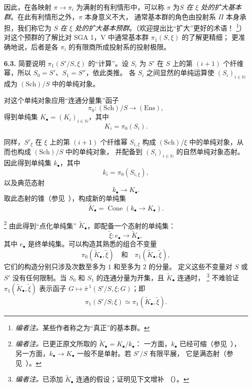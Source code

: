 因此，在各映射 \(\pi\to\pi_i\) 为满射的有利情形中，可以称 \(\pi\)
为\emph{\(S\) 在 \(\xi\) 处的扩大基本群}。在此有利情形之外，\(\pi\) 本身意义不大，
通常基本群的角色由投射系 \(\Pi\) 本身承担，我们称它为
\emph{\(S\) 在 \(\xi\) 处的扩大基本预群}。（欢迎提出比“扩大”更好的术语！
\footnote{\textit{编者注。}某些作者称之为“真正”的基本群。}）
对这个预群的了解比对 SGA 1，V 中通常基本群 \(\pi_1(S,\xi)\) 的了解更精细；
更准确地说，后者是各 \(\pi_i\) 的有限商所成投射系的投射极限。

\par\medskip\noindent
\textbf{6.3.}\enspace
简要说明 \(\pi_1(S'/S,\xi)\) 的“计算”。设 \(S_i\) 为 \(S'\) 在 \(S\)
上的第 \((i+1)\) 个纤维幂，所以 \(S_0=S'\)、\(S_1=S''\)，依此类推。
各 \(S_i\) 之间显然的单纯运算使 \((S_i)_{i\in\mathbb N}\)
成为 \((\mathrm{Sch})/S\) 中的单纯对象。

对这个单纯对象应用“连通分量集”函子
\[
  \pi_0:(\mathrm{Sch})/S\longrightarrow(\mathrm{Ens}),
\]
得到单纯集 \(K_\bullet=(K_i)_{i\in\mathbb N}\)，其中
\[
  K_i=\pi_0(S_i).
\]

同样，\(S'_\xi\) 在 \(\xi\) 上的第 \((i+1)\) 个纤维幂 \(S_{i,\xi}\)
构成 \((\mathrm{Sch})/\xi\) 中的单纯对象，从而也构成 \((\mathrm{Sch})/S\) 中的单纯对象，
并配备到 \((S_i)_{i\in\mathbb N}\) 的自然单纯对象态射。因此得到单纯集 \(k_\bullet\)，其中
\[
  k_i=\pi_0(S_{i,\xi}),
\]
以及典范态射
\[
  k_\bullet\longrightarrow K_\bullet.
\]
取此态射的锥（参见\ ），构成新的单纯集
\[
  \widetilde K_\bullet
  =
  \operatorname{Cone}(k_\bullet\longrightarrow K_\bullet).
\]

\footnote{\textit{编者注。}已更正原文所取的 \(\widetilde K_\bullet=K_\bullet/k_\bullet\)：
一方面，\(k_\bullet\) 已经可缩（参见\ ），
另一方面，\(k_\bullet\to K_\bullet\) 一般不是单射。若 \(S'/S\) 有限平展，
它是满态射（参见\ ）。}
由此得到“点化单纯集” \(\widetilde K_\bullet\)，即配备一个态射的单纯集：
\[
  \widetilde\xi:e_\bullet\longrightarrow\widetilde K_\bullet,
\]
其中 \(e_\bullet\) 是终单纯集。可以构造其熟悉的组合不变量
\[
  \pi_0(\widetilde K_\bullet,\widetilde\xi)
  \quad\text{和}\quad
  \pi_1(\widetilde K_\bullet,\widetilde\xi),
\]
它们的构造分别只涉及次数至多为 \(1\) 和至多为 \(2\) 的分量。
定义这些不变量对 \(S\) 或 \(S'\) 没有任何限制。当 \(S_0\) 和 \(S_1\)
的连通分量为开集，且 \(\widetilde K_\bullet\) 连通时，
\footnote{\textit{编者注。}已添加 \(\widetilde K_\bullet\) 连通的假设；证明见下文增补
（）。}
不难验证 \(\pi_1(\widetilde K_\bullet,\widetilde\xi)\) 表示函子
\(G\mapsto\bar\pi^{\,1}(S'/S,\xi;G)\)；即
\[
  \pi_1(S'/S;\xi)
  \simeq
  \pi_1(\widetilde K_\bullet,\widetilde\xi).
\]

